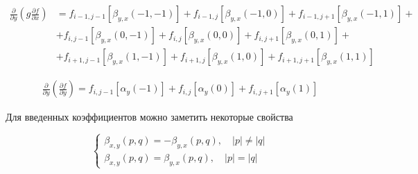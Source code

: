 \begin{equation*}
    \begin{split}
        \frac
            {\partial}
            {\partial y}
        \left(
            g
            \frac
                {\partial f}
                {\partial x}
        \right)
        &
        =
        f_{i-1, j-1}
        \left[
            \beta_{y,x} \left(-1, -1\right)
        \right]
        +
        f_{i-1,j}
        \left[
            \beta_{y,x} \left(-1, 0\right)
        \right]
        +
        f_{i-1, j+1}
        \left[
            \beta_{y,x} \left(-1, 1\right)
        \right]
        +
        \\
        &
        +
        f_{i, j-1}
        \left[
            \beta_{y,x} \left(0, -1\right)
        \right]
        +
        f_{i, j}
        \left[
            \beta_{y,x} \left(0, 0\right)
        \right]
        +
        f_{i, j+1}
        \left[
            \beta_{y,x} \left(0, 1\right)
        \right]
        +
        \\
        &
        +
        f_{i+1, j-1}
        \left[
            \beta_{y,x} \left(1, -1\right)
        \right]
        +
        f_{i+1, j}
        \left[
            \beta_{y,x} \left(1, 0\right)
        \right]
        +
        f_{i+1, j+1}
        \left[
            \beta_{y,x} \left(1, 1\right)
        \right]
    \end{split}
\end{equation*}

\begin{equation*}
    \begin{split}
        \frac
            {\partial}
            {\partial y}
        \left(
            \frac
                {\partial f}
                {\partial y}
        \right)
        =
        f_{i, j-1}
        \left[
            \alpha_y \left(-1\right)
        \right]
        +
        f_{i, j}
        \left[
            \alpha_y \left(0\right)
        \right]
        +
        f_{i, j+1}
        \left[
            \alpha_y \left(1\right)
        \right]
    \end{split}
\end{equation*}

Для введенных коэффициентов можно заметить некоторые свойства

\begin{equation*}
    \begin{cases}
        \beta_{x,y} \left(p, q\right)
        =
        -
        \beta_{y,x} \left(p,q\right),
            \quad
            \left|p\right|
            \ne
            \left|q\right|
        \\
        \beta_{x,y} \left(p, q\right)
        =
        \beta_{y,x} \left(p,q\right),
            \quad
            \left|p\right|
            =
            \left|q\right|
    \end{cases}
\end{equation*}

